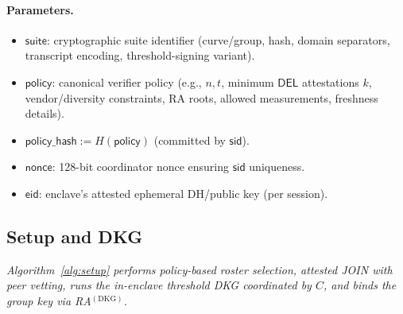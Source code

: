\documentclass[runningheads,orivec]{llncs}
\newcommand{\sid}{\mathsf{sid}}
\begin{document}
\paragraph{Parameters.}
\begin{itemize}[leftmargin=*,itemsep=0.25em]
  \item $\mathsf{suite}$: cryptographic suite identifier (curve/group, hash, domain separators, transcript encoding, threshold-signing variant).
  \item $\mathsf{policy}$: canonical verifier policy (e.g., $n,t$, minimum $\mathsf{DEL}$ attestations $k$, vendor/diversity constraints, RA roots, allowed measurements, freshness details).
  \item $\mathsf{policy\_hash} := H(\mathsf{policy})$ (committed by $\mathsf{sid}$).
  \item $\mathsf{nonce}$: 128-bit coordinator nonce ensuring $\mathsf{sid}$ uniqueness.
  \item $\mathsf{eid}$: enclave’s attested ephemeral DH/public key (per session).
\end{itemize}


\subsection{Setup and DKG}
\emph{Algorithm~\ref{alg:setup} performs policy-based roster selection, attested JOIN with peer vetting, runs the in\mbox{-}enclave threshold DKG coordinated by $C$, and binds the group key via RA$^{(\mathrm{DKG})}$.}
\end{document}
